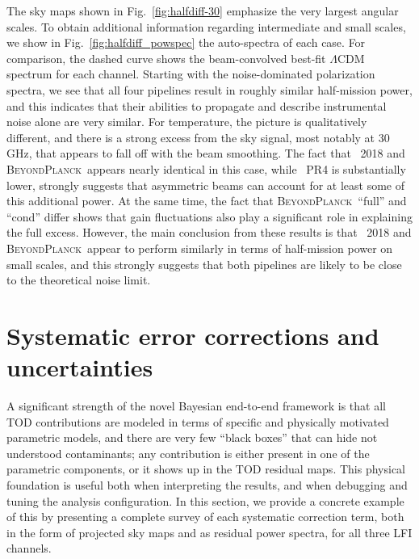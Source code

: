 \documentclass[twocolumn]{aa}
\newcommand{\BP}{\textsc{BeyondPlanck}}
\begin{document}
The sky maps shown in Fig.~\ref{fig:halfdiff-30} emphasize the very
largest angular scales. To obtain additional information regarding
intermediate and small scales, we show in
Fig.~\ref{fig:halfdiff_powspec} the auto-spectra of each case. For
comparison, the dashed curve shows the beam-convolved best-fit
$\Lambda$CDM spectrum for each channel. Starting with the
noise-dominated polarization spectra, we see that all four pipelines
result in roughly similar half-mission power, and this indicates that
their abilities to propagate and describe instrumental noise alone are
very similar. For temperature, the picture is qualitatively different,
and there is a strong excess from the sky signal, most notably at
30\,GHz, that appears to fall off with the beam smoothing. The fact
that \Planck\ 2018 and \BP\ appears nearly identical in this case,
while \Planck\ PR4 is substantially lower, strongly suggests that
asymmetric beams can account for at least some of this additional
power. At the same time, the fact that \BP\ ``full'' and ``cond''
differ shows that gain fluctuations also play a significant role in
explaining the full excess. However, the main conclusion from these
results is that \Planck\ 2018 and \BP\ appear to perform similarly in
terms of half-mission power on small scales, and this strongly
suggests that both pipelines are likely to be close to the theoretical
noise limit. 





\section{Systematic error corrections and uncertainties}
\label{sec:systematics}

A significant strength of the novel Bayesian end-to-end framework is
that all TOD contributions are modeled in terms of specific and
physically motivated parametric models, and there are very few ``black
boxes'' that can hide not understood contaminants; any contribution is
either present in one of the parametric components, or it shows up in
the TOD residual maps. This physical foundation is useful both when
interpreting the results, and when debugging and tuning the analysis
configuration. In this section, we provide a concrete example of this
by presenting a complete survey of each systematic correction term,
both in the form of projected sky maps and as residual power spectra,
for all three LFI channels.
\end{document}
